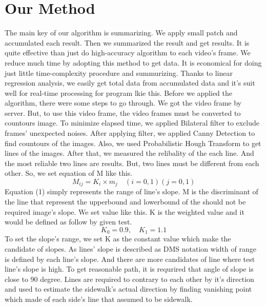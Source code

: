 \section{Our Method}
\label{sec:ourmethod}
The main key of our algorithm is summarizing. We apply small patch and accumulated each result. Then we summarized the result and get results. It is quite effective than just do high-accuracy algorithm to each video's frame. We reduce much time by adopting this method to get data. It is economical for doing just little time-complexity procedure and summurizing. Thanks to linear regression analysis, we easily get total data from accumulated data and it's suit well for real-time processing for program lkie this.
\newline\newline 
Before we applied the algorithm, there were some steps to go through. We got the video frame by server. But, to use this video frame, the video frames must be converted to countours image. To minimize elapsed time, we applied Bilateral filter to exclude frames' unexpected noises. After applying filter, we applied Canny Detection to find countours of the images. Also, we used Probabilistic Hough Transform to get lines of the images. After that, we measured the relibality of the each line. And the most reliable two lines are results. But, two lines must be different from each other. So, we set equation of M like this.
\begin{equation}
\mathit{{M}_{ij} = {K}_{i} \times {m}_{j}} \quad\left(i=0,1 \right) \left(j=0,1 \right)
\end{equation}
Equation (1) simply represents the range of line's slope. M is the discriminant of the line that represent the upperbound and lowerbound of the should not be required image's slope. We set value like this. K is the weighted value and it would be defined as follow by given test.
\begin{equation}{K}_{0} = 0.9,\quad{K}_{1} = 1.1\end{equation} 
To set the slope's range, we set K as the constant value which make the candidate of slopes. As lines' slope is described as DMS notation width of range is defined by each line's slope. And there are more candidates of line where test line's slope is high. To get reasonable path, it is requrired that angle of slope is close to 90 degree. Lines are required to contrary to each other by it's direction and used to estimate the sidewalk's actual direction by finding vanishing point which made of each side's line that assumed to be sidewalk. 
